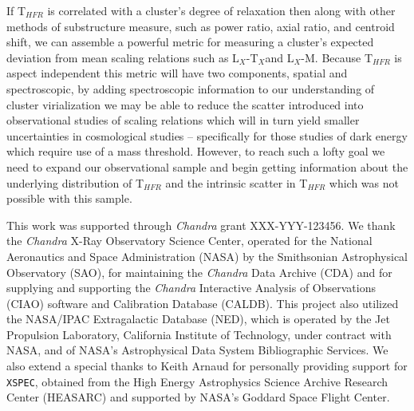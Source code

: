 \documentclass{emulateapj}
\newcommand{\tf}{T$_{HFR}$ }
\newcommand{\tx}{T$_{X}$}
\newcommand{\chan}{{\textit{Chandra }}}
\begin{document}
If \tf is correlated with a cluster's degree of relaxation then along
with other methods of substructure measure, such as power ratio, axial
ratio, and centroid shift, we can assemble a powerful metric for
measuring a cluster's expected deviation from mean scaling relations
such as L$_X$-\tx and L$_X$-M. Because \tf is aspect independent
this metric will have two components, spatial and spectroscopic,
by adding spectroscopic information to our understanding of cluster
virialization we may be able to reduce the scatter introduced into
observational studies of scaling relations which will in turn yield
smaller uncertainties in cosmological studies -- specifically for
those studies of dark energy which require use of a mass
threshold. However, to reach such a lofty goal we need to expand our
observational sample and begin getting information about the
underlying distribution of \tf and the intrinsic scatter in \tf which
was not possible with this sample.


\acknowledgements
This work was supported through \chan grant
XXX-YYY-123456. We thank the \chan X-Ray Observatory Science Center,
operated for the National Aeronautics and Space Administration (NASA)
by the Smithsonian Astrophysical Observatory (SAO), for maintaining
the \chan Data Archive (CDA) and for supplying and supporting the
\chan Interactive Analysis of Observations (CIAO) software and
Calibration Database (CALDB). This project also utilized the NASA/IPAC
Extragalactic Database (NED), which is operated by the Jet Propulsion
Laboratory, California Institute of Technology, under contract with
NASA, and of NASA's Astrophysical Data System Bibliographic
Services. We also extend a special thanks to Keith Arnaud for
personally providing support for {\tt XSPEC}, obtained from the High
Energy Astrophysics Science Archive Research Center (HEASARC) and
supported by NASA's Goddard Space Flight Center.








\clearpage
\LongTables


\end{document}
